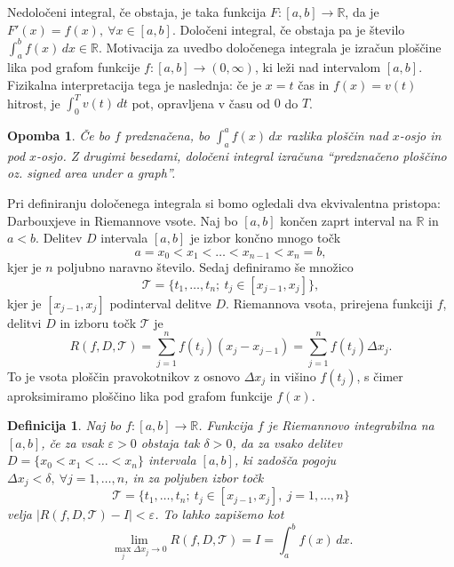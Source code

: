 \documentclass[10pt, a4paper]{article}
\newtheorem{defi}[izr]{Definicija}
\newenvironment{noticeB}{%
  \tcolorbox[%
  notitle,
  empty,
  enhanced,  %
  breakable,
  coltext=black,
  colback=white, 
  fontupper=\rmfamily,
  noparskip,
  sharp corners,
  boxrule=-1pt,  %
  frame hidden,
  left=7pt,  %
  right=7pt,
  top=5pt,
  bottom=5pt,
  before skip=2.5ex plus 2pt,
  after skip=2.5ex plus 2pt,
  borderline west = {1.5pt}{-0.1pt}{blue!30!black}, %
  overlay unbroken and last={%
    \draw[color=black, line width=1.25pt]
    ($(frame.south west)+(1.pt, -0.1pt)$) -- ++(2em, 0);
  }
  ]}
{\endtcolorbox}
\newenvironment{definicija}{\begin{noticeB}\begin{defi}}{%
\end{defi}\end{noticeB}}
\newtheorem*{opomba}{Opomba}
\newcommand{\R}{\mathbb {R}}
\newcommand{\limf}[3]{\lim_{#1 \to #2} {#3}}
\begin{document}
Nedoločeni integral, če obstaja, je taka funkcija $F: [a, b] \rightarrow \R$, da je $F'(x) = f(x),\ \forall x \in [a, b]$.
Določeni integral, če obstaja pa je število $\int_{a} ^{b} f(x)\,dx \in \R$.
Motivacija za uvedbo določenega integrala je izračun ploščine lika pod grafom funkcije $f: [a, b] \rightarrow (0, \infty)$, ki leži nad intervalom $[a, b]$.
Fizikalna interpretacija tega je naslednja: če je $x = t$ čas in $f(x) = v(t)$ hitrost, je $\int_{0} ^{T} v(t)\,dt$ pot, opravljena v času od $0$ do $T$.

\begin{opomba}
    Če bo $f$ predznačena, bo $\int_{a} ^a f(x)\,dx$ razlika ploščin nad $x$-osjo in pod $x$-osjo.
    Z drugimi besedami, določeni integral izračuna "`predznačeno ploščino oz. signed area under a graph"'.
\end{opomba}

Pri definiranju določenega integrala si bomo ogledali dva ekvivalentna pristopa: Darbouxjeve in Riemannove vsote.
Naj bo $[a, b]$ končen zaprt interval na $\R$ in $a < b$.
Delitev $D$ intervala $[a, b]$ je izbor končno mnogo točk
$$a = x_0 < x_1 < \dots < x_{n-1} < x_n = b,$$
kjer je $n$ poljubno naravno število. Sedaj definiramo še množico
$$\mathcal{T} = \{t_1, \dots, t_n;\ t_j \in [x_{j-1}, x_{j}]\},$$
kjer je $[x_{j-1}, x_j]$ podinterval delitve $D$.
Riemannova vsota, prirejena funkciji $f$, delitvi $D$ in izboru točk $\mathcal{T}$ je
$$R(f, D, \mathcal{T}) = \sum_{j = 1} ^n f(t_j) (x_j - x_{j-1}) = \sum_{j = 1} ^n f(t_j) \Delta x_j.$$
To je vsota ploščin pravokotnikov z osnovo $\Delta x_j$ in višino $f(t_j)$, s čimer aproksimiramo ploščino lika pod grafom funkcije $f(x)$.

\begin{definicija}
    Naj bo $f:[a,b] \rightarrow \R$. Funkcija $f$ je Riemannovo integrabilna na $[a, b]$, če za vsak $\varepsilon > 0$ obstaja tak $\delta > 0$, da za vsako delitev $D = \{x_0 < x_1 < \dots < x_n\}$ intervala $[a, b]$, ki zadošča pogoju $\Delta x_j < \delta,\ \forall j = 1, \dots, n$, 
    in za poljuben izbor točk $$\mathcal{T} = \{t_1, \dots, t_n;\ t_j \in [x_{j-1}, x_j],\ j = 1, \dots, n\}$$
    velja $|R(f, D, \mathcal{T}) - I| < \varepsilon$.
    To lahko zapišemo kot $$\limf{\max_j \Delta x_j}{0}{R(f, D, \mathcal{T})} = I = \int_{a} ^b f(x)\,dx.$$
\end{definicija}
\end{document}
